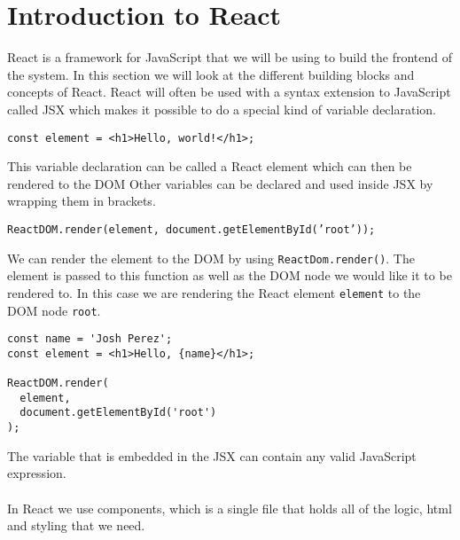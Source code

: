 \section{Introduction to React}
React is a framework for JavaScript that we will be using to build the frontend of the system. 
In this section we will look at the different building blocks and concepts of React.
React will often be used with a syntax extension to JavaScript called JSX which makes it possible to do a special kind of variable declaration.

\begin{center}
    \texttt{const element = <h1>Hello, world!</h1>;}
\end{center}
This variable declaration can be called a React element which can then be rendered to the DOM
Other variables can be declared and used inside JSX by wrapping them in brackets.
\begin{center}
    \texttt{ReactDOM.render(element, document.getElementById('root'));}
\end{center}
We can render the element to the DOM by using \texttt{ReactDom.render()}. 
The element is passed to this function as well as the DOM node we would like it to be rendered to. 
In this case we are rendering the React element \texttt{element} to the DOM node \texttt{root}.
\begin{lstlisting}
const name = 'Josh Perez';
const element = <h1>Hello, {name}</h1>;

ReactDOM.render(
  element,
  document.getElementById('root')
);
\end{lstlisting}
The variable that is embedded in the JSX can contain any valid JavaScript expression.
\\\\
In React we use components, which is a single file that holds all of the logic, html and styling that we need.

